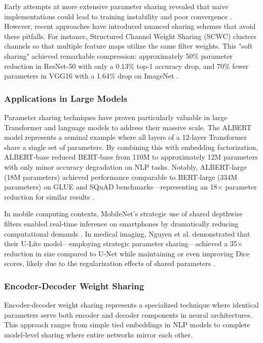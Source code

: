 \documentclass[12pt,a4paper]{article}
\begin{document}
Early attempts at more extensive parameter sharing revealed that naive implementations could lead to training instability and poor convergence \cite{jeong2021}. However, recent approaches have introduced nuanced sharing schemes that avoid these pitfalls. For instance, Structured Channel Weight Sharing (SCWC) clusters channels so that multiple feature maps utilize the same filter weights. This "soft sharing" achieved remarkable compression: approximately 50\% parameter reduction in ResNet-50 with only a 0.13\% top-1 accuracy drop, and 70\% fewer parameters in VGG16 with a 1.64\% drop on ImageNet \cite{li2022}.

\subsubsection{Applications in Large Models}

Parameter sharing techniques have proven particularly valuable in large Transformer and language models to address their massive scale. The ALBERT model \cite{lan2020} represents a seminal example where all layers of a 12-layer Transformer share a single set of parameters. By combining this with embedding factorization, ALBERT-base reduced BERT-base from 110M to approximately 12M parameters with only minor accuracy degradation on NLP tasks. Notably, ALBERT-large (18M parameters) achieved performance comparable to BERT-large (334M parameters) on GLUE and SQuAD benchmarks—representing an 18$\times$ parameter reduction for similar results \cite{lan2020}.

In mobile computing contexts, MobileNet's strategic use of shared depthwise filters enabled real-time inference on smartphones by dramatically reducing computational demands \cite{howard2017, sandler2018}. In medical imaging, Nguyen et al. demonstrated that their U-Lite model—employing strategic parameter sharing—achieved a 35$\times$ reduction in size compared to U-Net while maintaining or even improving Dice scores, likely due to the regularization effects of shared parameters \cite{nguyen2023}.

\subsubsection{Encoder-Decoder Weight Sharing}

Encoder-decoder weight sharing represents a specialized technique where identical parameters serve both encoder and decoder components in neural architectures. This approach ranges from simple tied embeddings in NLP models to complete model-level sharing where entire networks mirror each other.
\end{document}
